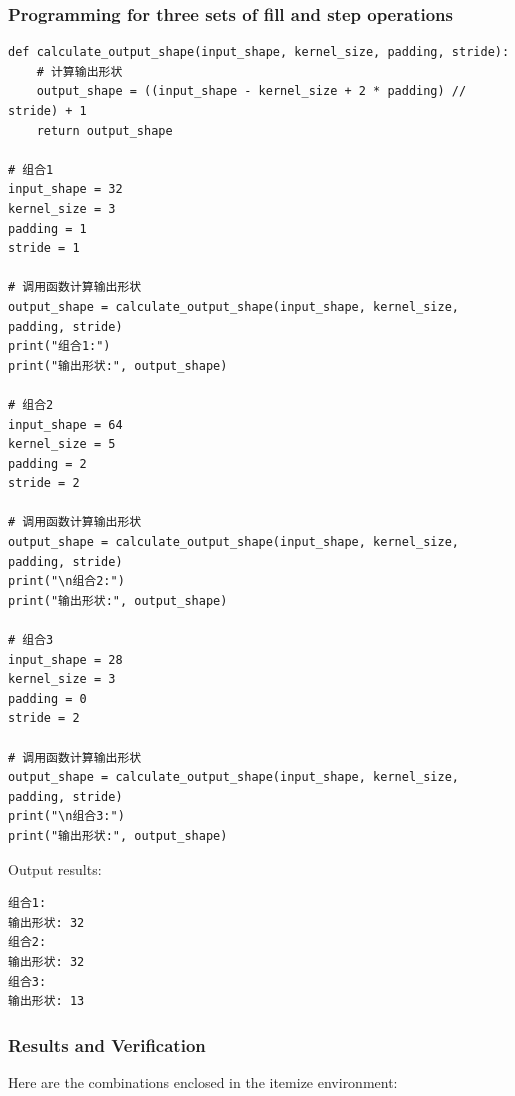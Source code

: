 \documentclass[a4paper,12pt]{article}
\begin{document}
\subsubsection{Programming for three sets of fill and step operations}
\begin{lstlisting}
def calculate_output_shape(input_shape, kernel_size, padding, stride):
    # 计算输出形状
    output_shape = ((input_shape - kernel_size + 2 * padding) // stride) + 1
    return output_shape

# 组合1
input_shape = 32
kernel_size = 3
padding = 1
stride = 1

# 调用函数计算输出形状
output_shape = calculate_output_shape(input_shape, kernel_size, padding, stride)
print("组合1:")
print("输出形状:", output_shape)

# 组合2
input_shape = 64
kernel_size = 5
padding = 2
stride = 2

# 调用函数计算输出形状
output_shape = calculate_output_shape(input_shape, kernel_size, padding, stride)
print("\n组合2:")
print("输出形状:", output_shape)

# 组合3
input_shape = 28
kernel_size = 3
padding = 0
stride = 2

# 调用函数计算输出形状
output_shape = calculate_output_shape(input_shape, kernel_size, padding, stride)
print("\n组合3:")
print("输出形状:", output_shape)
\end{lstlisting}
Output results:
\begin{lstlisting}
组合1:
输出形状: 32
组合2:
输出形状: 32
组合3:
输出形状: 13
\end{lstlisting}

\subsubsection{Results and Verification}
Here are the combinations enclosed in the itemize environment:
\end{document}

